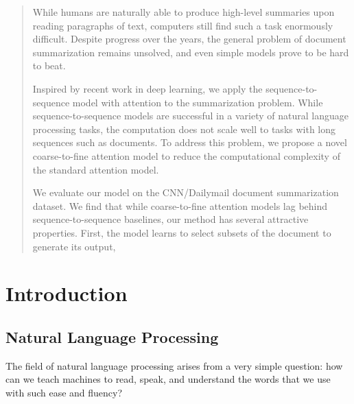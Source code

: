 \documentclass[12pt]{report}
\begin{document}
\begin{abstract} %
While humans are naturally able to produce high-level summaries upon reading paragraphs of text, computers still find such a task enormously difficult. Despite progress over the years, the general problem of document summarization remains unsolved, and even simple models prove to be hard to beat.

Inspired by recent work in deep learning, we apply the sequence-to-sequence model with attention to the summarization problem. While sequence-to-sequence models are successful in a variety of natural language processing tasks, the computation does not scale well to tasks with long sequences such as documents. To address this problem, we propose a novel coarse-to-fine attention model to reduce the computational complexity of the standard attention model.

We evaluate our model on the CNN/Dailymail document summarization dataset. We find that while coarse-to-fine attention models lag behind sequence-to-sequence baselines, our method has several attractive properties. First, the model learns to select subsets of the document to generate its output, 
\end{abstract}

\tableofcontents{}

\listoffigures

\listoftables




\chapter{Introduction}


\section{Natural Language Processing}

The field of natural language processing arises from a very simple question: how can we teach machines to read, speak, and understand the words that we use with such ease and fluency?
\end{document}
